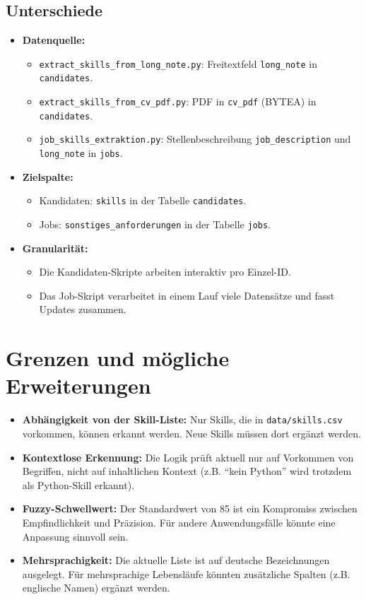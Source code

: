\documentclass[12pt,a4paper]{article}
\begin{document}
\subsection{Unterschiede}

\begin{itemize}
    \item \textbf{Datenquelle:}
    \begin{itemize}
        \item \texttt{extract\_skills\_from\_long\_note.py}: Freitextfeld \texttt{long\_note} in \texttt{candidates}.
        \item \texttt{extract\_skills\_from\_cv\_pdf.py}: PDF in \texttt{cv\_pdf} (BYTEA) in \texttt{candidates}.
        \item \texttt{job\_skills\_extraktion.py}: Stellenbeschreibung \texttt{job\_description} und
              \texttt{long\_note} in \texttt{jobs}.
    \end{itemize}
    \item \textbf{Zielspalte:}
    \begin{itemize}
        \item Kandidaten: \texttt{skills} in der Tabelle \texttt{candidates}.
        \item Jobs: \texttt{sonstiges\_anforderungen} in der Tabelle \texttt{jobs}.
    \end{itemize}
    \item \textbf{Granularität:}
    \begin{itemize}
        \item Die Kandidaten-Skripte arbeiten interaktiv pro Einzel-ID.
        \item Das Job-Skript verarbeitet in einem Lauf viele Datensätze
              und fasst Updates zusammen.
    \end{itemize}
\end{itemize}

\section{Grenzen und mögliche Erweiterungen}

\begin{itemize}
    \item \textbf{Abhängigkeit von der Skill-Liste:} Nur Skills, die in
          \texttt{data/skills.csv} vorkommen, können erkannt werden. Neue
          Skills müssen dort ergänzt werden.
    \item \textbf{Kontextlose Erkennung:} Die Logik prüft aktuell nur auf
          Vorkommen von Begriffen, nicht auf inhaltlichen Kontext
          (z.B. ``kein Python'' wird trotzdem als Python-Skill erkannt).
    \item \textbf{Fuzzy-Schwellwert:} Der Standardwert von 85 ist ein
          Kompromiss zwischen Empfindlichkeit und Präzision. Für andere
          Anwendungsfälle könnte eine Anpassung sinnvoll sein.
    \item \textbf{Mehrsprachigkeit:} Die aktuelle Liste ist auf deutsche
          Bezeichnungen ausgelegt. Für mehrsprachige Lebensläufe könnten
          zusätzliche Spalten (z.B. englische Namen) ergänzt werden.
\end{itemize}
\end{document}
